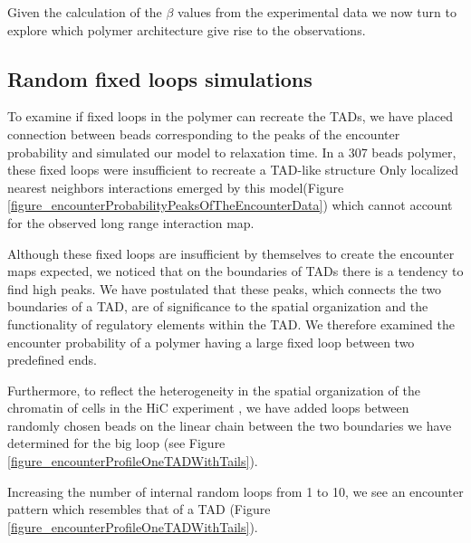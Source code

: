 \documentclass[12pt]{article}
\begin{document}
Given the calculation of the $\beta$ values from the experimental data we now turn to explore which polymer architecture give rise to the observations.

\subsection{Random fixed loops simulations}\label{subsection_randomFixedLoopsSimulations}
To examine if fixed loops in the polymer can recreate the TADs, we have placed connection between beads corresponding to the peaks of the encounter probability and simulated our model to relaxation time.
In a 307 beads polymer, these fixed loops were insufficient to recreate a TAD-like structure
Only localized nearest neighbors interactions emerged by this model(Figure \ref{figure_encounterProbabilityPeaksOfTheEncounterData}) which cannot account for the observed long range interaction map.

Although these fixed loops are insufficient by themselves to create the encounter maps expected, we noticed that on the boundaries of TADs there is a tendency to find high peaks. We have postulated that these peaks, which connects the two boundaries of a TAD, are of significance to the spatial organization and the functionality of regulatory elements within the TAD.  We therefore examined the encounter probability of a polymer having a large fixed loop between two predefined ends.

Furthermore, to reflect the heterogeneity in the spatial organization of the chromatin of cells in the HiC experiment \cite{dekker2013exploring} \cite{Nora2012}, we have added loops between randomly chosen beads on the linear chain between the two boundaries we have determined for the big loop (see Figure \ref{figure_encounterProfileOneTADWithTails}).

Increasing the number of internal random loops from 1 to 10, we see an encounter pattern which resembles that of a TAD (Figure \ref{figure_encounterProfileOneTADWithTails}).
\end{document}

